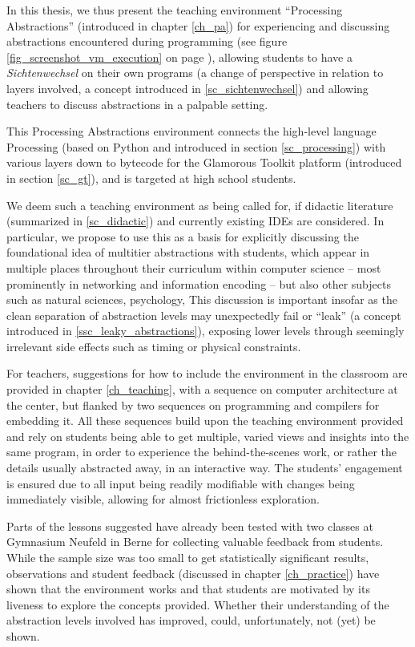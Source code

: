In this thesis, we thus present the teaching environment ``Processing Abstractions'' (introduced in chapter \ref{ch_pa}) for experiencing and discussing abstractions encountered during programming (see \eg figure \ref{fig_screenshot_vm_execution} on page \pageref{fig_screenshot_vm_execution}), allowing students to have a \emph{Sichtenwechsel} on their own programs (\ie a change of perspective in relation to layers involved, a concept introduced in \ref{sc_sichtenwechsel}) and allowing teachers to discuss abstractions in a palpable setting.

This Processing Abstractions environment connects the high-level language Processing (based on Python and introduced in section \ref{sc_processing}) with various layers down to bytecode for the Glamorous Toolkit platform (introduced in section \ref{sc_gt}), and is targeted at high school students.

We deem such a teaching environment as being called for, if didactic literature (summarized in \ref{sc_didactic}) and currently existing \acp{IDE} are considered. In particular, we propose to use this as a basis for explicitly discussing the foundational idea of multitier abstractions with students, which appear in multiple places throughout their curriculum within computer science -- most prominently in networking and information encoding -- but also other subjects such as natural sciences, psychology, \etc This discussion is important insofar as the clean separation of abstraction levels may unexpectedly fail or ``leak'' (a concept introduced in \ref{ssc_leaky_abstractions}), exposing lower levels through seemingly irrelevant side effects such as timing or physical constraints.

For teachers, suggestions for how to include the environment in the classroom are provided in chapter \ref{ch_teaching}, with a sequence on computer architecture at the center, but flanked by two sequences on programming and compilers for embedding it. All these sequences build upon the teaching environment provided and rely on students being able to get multiple, varied views and insights into the same program, in order to experience the behind-the-scenes work, or rather the details usually abstracted away, in an interactive way. The students' engagement is ensured due to all input being readily modifiable with changes being immediately visible, allowing for almost frictionless exploration.

Parts of the lessons suggested have already been tested with two classes at Gymnasium Neufeld in Berne for collecting valuable feedback from students. While the sample size was too small to get statistically significant results, observations and student feedback (discussed in chapter \ref{ch_practice}) have shown that the environment works and that students are motivated by its liveness to explore the concepts provided. Whether their understanding of the abstraction levels involved has improved, could, unfortunately, not (yet) be shown.

